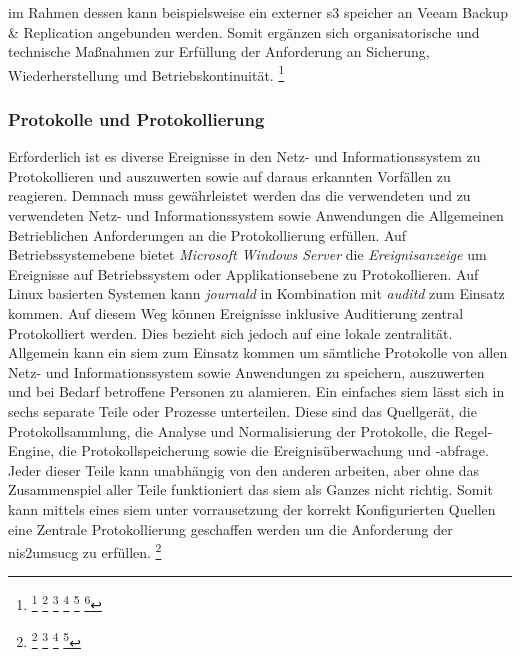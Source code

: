 \documentclass[11pt,a4paper,hidelinks]{article}   %
\begin{document}
im Rahmen dessen kann beispielsweise ein externer \gls{s3} speicher an Veeam Backup \& Replication angebunden werden. Somit ergänzen sich organisatorische und technische Maßnahmen zur Erfüllung der Anforderung an Sicherung, Wiederherstellung und Betriebskonti­nuität.
            \footnote{
                \footcite[Vgl. S. 1 - 3][]{9781931332767}
                \footcite[Vgl. S. 244][]{9781849285391}
                \footcite[Vgl. S. 228 – 230][]{9781118094839}
                \footcite[Vgl. S. 3, 24 - 33][]{9781837630097} %
                \footcite[Vgl. S. 3 , 39 - 40, 47 - 48][]{9781803236810} %
                \footcite[Vgl. §13][]{KRITIS-DachG}
            }
            \subsubsection{Protokolle und Protokollierung}
            Erforderlich ist es diverse Ereignisse in den Netz- und Informationssystem zu Protokollieren und auszuwerten sowie auf daraus erkannten Vorfällen zu reagieren. Demnach muss gewährleistet werden das die verwendeten und zu verwendeten Netz- und Informationssystem sowie Anwendungen die Allgemeinen Betrieblichen Anforderungen an die Protokollierung erfüllen. Auf Betriebssystemebene bietet \emph{Microsoft Windows Server} die \emph{Ereignisanzeige} um Ereignisse auf Betriebssystem oder Applikationsebene zu Protokollieren. Auf Linux basierten Systemen kann \emph{journald} in Kombination mit \emph{auditd} zum Einsatz kommen. Auf diesem Weg können Ereignisse inklusive Auditierung zentral Protokolliert werden. Dies bezieht sich jedoch auf eine lokale zentralität. Allgemein kann ein \gls{siem} zum Einsatz kommen um sämtliche Protokolle von allen Netz- und Informationssystem sowie Anwendungen zu speichern, auszuwerten und bei Bedarf betroffene Personen zu alamieren. Ein einfaches \gls{siem} lässt sich in sechs separate Teile oder Prozesse unterteilen. Diese sind das Quellgerät, die Protokollsammlung, die Analyse und Normalisierung der Protokolle, die Regel-Engine, die Protokollspeicherung sowie die Ereignisüberwachung und -abfrage. Jeder dieser Teile kann unabhängig von den anderen arbeiten, aber ohne das Zusammenspiel aller Teile funktioniert das \gls{siem} als Ganzes nicht richtig. Somit kann mittels eines \gls{siem} unter vorrausetzung der korrekt Konfigurierten Quellen eine Zentrale Protokollierung geschaffen werden um die Anforderung der \gls{nis2umsucg} zu erfüllen.
            \footnote{
                \footcite[Vgl. S. 106 - 107][]{iso27002-2022}
                \footcite[Vgl. S. 463 - 469, 516 - 519][]{9781838981778}
                \footcite[Vgl. S. 529 - 533][]{9781305078628}
                \footcite[Vgl. S. 78 - 91][]{9780071701082}
            }
\end{document}
